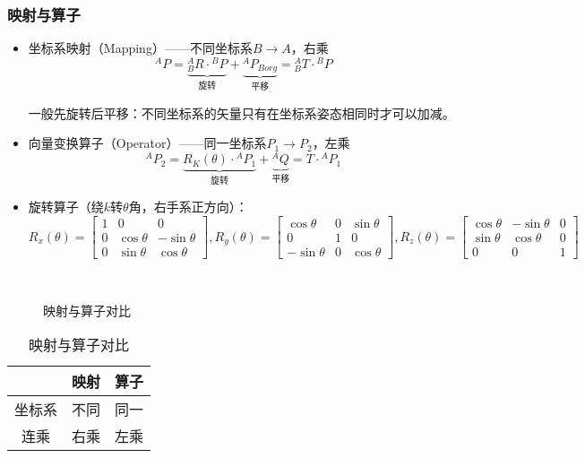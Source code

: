 \documentclass[
12pt, %
a4paper, 
oneside, %
headinclude,footinclude, %
]{scrartcl}
\begin{document}
\subsubsection[映射与算子]{映射与算子}
\begin{itemize}
\item 坐标系映射（Mapping）——不同坐标系$ B \rightarrow A $，右乘
$$ {}^A P = \underbrace{{}^A_B R \cdot {}^B P}_{\text{旋转}} + \underbrace{{}^A P_{Borg}}_{\text{平移}} = {}^A_B T \cdot {}^B P $$

一般先旋转后平移：不同坐标系的矢量只有在坐标系姿态相同时才可以加减。
\item 向量变换算子（Operator）——同一坐标系$ P_1 \rightarrow P_2 $，左乘
$$ {}^A P_2 = \underbrace{R_K(\theta) \cdot {}^A P_1}_{\text{旋转}} + \underbrace{{}^A Q}_{\text{平移}} = T \cdot {}^A P_1 $$
\item 旋转算子（绕$ k $转$ \theta $角，右手系正方向）：
$$
R_x(\theta) = \begin{bmatrix} 1 & 0 & 0 \\ 0 & \cos\theta & -\sin\theta \\ 0 & \sin\theta & \cos\theta \end{bmatrix}, 
R_y(\theta) = \begin{bmatrix} \cos\theta & 0 & \sin\theta \\ 0 & 1 & 0 \\ -\sin\theta & 0 & \cos\theta \end{bmatrix}, 
R_z(\theta) = \begin{bmatrix} \cos\theta & -\sin\theta & 0 \\ \sin\theta & \cos\theta & 0 \\ 0 & 0 & 1 \end{bmatrix}
$$
\end{itemize}
\begin{minipage}{0.6\textwidth}
\begin{figure}[H]
\centering
{} \quad
{} \\
 \quad
{}
\caption{映射与算子对比}
\end{figure}
\end{minipage}
\begin{minipage}{0.4\textwidth}
\begin{table}[H]
\centering
\begin{tabular}{c|cc}
\hline
& 映射 & 算子 \\
\hline
坐标系 & 不同 & 同一 \\
连乘 & 右乘 & 左乘 \\
\hline
\end{tabular}
\caption{映射与算子对比}
\end{table}
\end{minipage}
\end{document}
